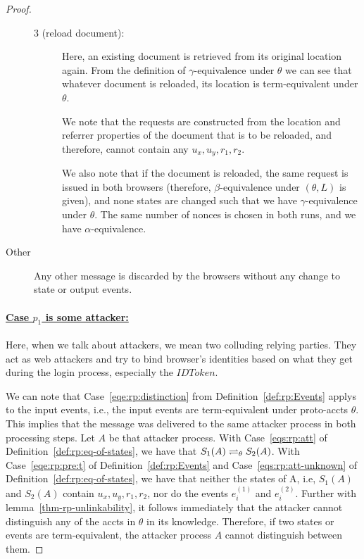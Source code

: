 \begin{proof}
\begin{description}
\begin{description}
        \item[3 (reload document):]
          Here, an existing document is retrieved from its original location again. 
          From the definition of $\gamma$-equivalence under $\theta$ we can see that
          whatever document is reloaded, its location is term-equivalent under $\theta$.
      
          We note that the requests are constructed from
          the location and referrer properties of the document that is to
          be reloaded, and therefore, cannot contain any $u_x, u_y, r_1, r_2$.
      
          We also note that if the document is reloaded, the same 
          request is issued in both browsers (therefore,
          $\beta$-equivalence under $(\theta, L)$ is given), and 
          none states are changed such that we have
          $\gamma$-equivalence under $\theta$. The same number of
          nonces is chosen in both runs, and we have $\alpha$-equivalence.
        \end{description}
      \item[Other] Any other message is discarded by the browsers without any change to state or output events.
    \end{description}
  
    \paragraph{\underline{Case $p_1$ is some attacker:}}
    
    Here, when we talk about attackers, 
    we mean two colluding relying parties.
    They act as web attackers and try to bind browser's identities 
    based on what they get during the login process, 
    especially the $IDToken$.
    
    We can note that Case~\ref{eqe:rp:distinction} from Definition~\ref{def:rp:Events} applys to the input events,
    i.e., the input events are term-equivalent under proto-accts $\theta$. 
    This implies that the message was delivered to the 
    same attacker process in both processing steps. 
    Let $A$ be that attacker process. 
    With Case~\ref{eqs:rp:att} of Definition~\ref{def:rp:eq-of-states}, 
    we have that $S_1(A) \rightleftharpoons_{\theta} S_2(A)$. 
    With Case~\ref{eqe:rp:pre:t} of Definition~\ref{def:rp:Events} and Case~\ref{eqs:rp:att-unknown} of Definition~\ref{def:rp:eq-of-states}, 
    we have that neither the states of A, i.e, $S_1(A)$ and $S_2(A)$ contain $u_x, u_y, r_1, r_2$, 
    nor do the events $e_i^{(1)}$ and $e_i^{(2)}$.
    Further with lemma~\ref{thm-rp-unlinkability}, it follows immediately that the attacker cannot distinguish any of the accts in $\theta$ in its knowledge.
    Therefore, if two states or events are term-equivalent, the attacker process $A$ cannot distinguish between them.


\end{proof}
